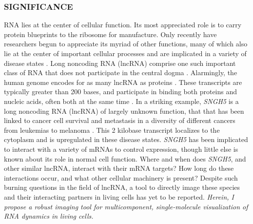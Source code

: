 

\subsubsection*{SIGNIFICANCE}
RNA lies at the center of cellular function. Its most appreciated role is to carry protein blueprints to the ribosome for manufacture.
Only recently have researchers begun to appreciate its myriad of other functions, many of which also lie at the center of important cellular processes and are implicated in a variety of disease states \cite{CechNoncodingRNARevolution2014,DellaRagioneNoncodingRNAschromatin2014,AnastasiadouNoncodingRNAnetworks2018}.
Long noncoding RNA (lncRNA) comprise one such important class of RNA that does not participate in the central dogma \cite{RinnGenomeRegulationLong2012}. Alarmingly, the human genome encodes for as many lncRNA as proteins \cite{Rinntranscriptionalactivityhuman2003,RinnGenomeRegulationLong2012}.
These transcripts are typically greater than 200 bases, and participate in binding both proteins and nucleic acids, often both at the same time \cite{AnastasiadouNoncodingRNAnetworks2018,RinnGenomeRegulationLong2012}.
In a striking example, \textit{SNGH5} is a long noncoding RNA (lncRNA) of largely unknown function, that that has been linked to cancer cell survival and metastasis in a diversity of different cancers from leukemias to melanoma \cite{TanakaRitsukoIntronicU50small2001,DamasSNHG5promotescolorectal2016,ZhaoLongnoncodingRNA2016,HeLncRNASNHG5regulates2017,YanSNHG5promotesproliferation2018,MalncRNASNHG5associated2018,ShenLncRNASNHG5miR26a2018,ZhengLongnoncodingRNA2018}.
This 2 kilobase transcript localizes to the cytoplasm and is upregulated in these disease states.
\textit{SNGH5} has been implicated to interact with a variety of mRNAs to control expression, though little else is known about its role in normal cell function.
Where and when does \textit{SNGH5}, and other similar lncRNA, interact with their mRNA targets?
How long do these interactions occur, and what other cellular machinery is present?
Despite such burning questions in the field of lncRNA, a tool to directly image these species and their interacting partners in living cells has yet to be reported. \textit{Herein, I propose a robust imaging tool for multicomponent, single-molecule visualization of RNA dynamics in living cells.}

